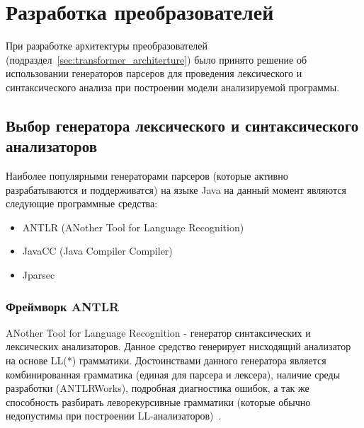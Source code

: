 \section{Разработка преобразователей}

При разработке архитектуры преобразователей
(подраздел~\ref{sec:transformer_architerture}) было принято решение об
использовании генераторов парсеров для проведения лексического и синтаксического
анализа при построении модели анализируемой программы.

\subsection{Выбор генератора лексического и синтаксического анализаторов}

Наиболее популярными генераторами парсеров (которые активно разрабатываются и
поддерживатся) на языке Java на данный момент являются следующие программные
средства:


\begin{itemize}
    \item ANTLR (ANother Tool for Language Recognition)
    \item JavaCC (Java Compiler Compiler)
    \item Jparsec
\end{itemize}

\subsubsection{Фреймворк ANTLR}

ANother Tool for Language Recognition - генератор синтаксических и лексических
анализаторов. Данное средство генерирует нисходящий анализатор на основе LL(*)
грамматики. Достоинствами данного генератора является комбинированная грамматика
(единая для парсера и лексера), наличие среды разработки (ANTLRWorks), подробная
диагностика ошибок, а так же способность разбирать леворекурсивные грамматики
(которые обычно недопустимы при построении LL-анализаторов)~\cite{parr_definitive_2007}.


